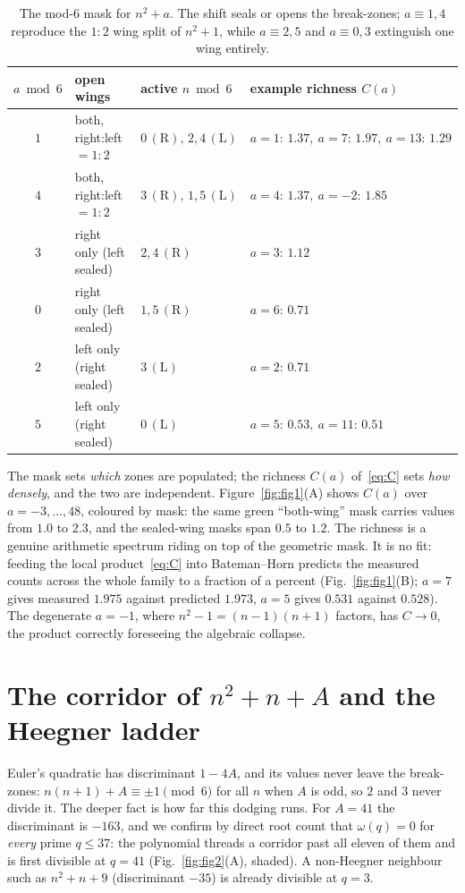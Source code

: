 \documentclass[11pt]{article}
\theoremstyle{definition}
\begin{document}
\begin{table}[t]
\centering\small
\begin{tabular}{clll}
\toprule
$a\bmod6$ & open wings & active $n\bmod6$ & example richness $C(a)$\\
\midrule
$1$ & both, right:left $=1{:}2$ & $0\,(\mathrm{R}),\,2,4\,(\mathrm{L})$ & $a{=}1{:}\,1.37,\ a{=}7{:}\,1.97,\ a{=}13{:}\,1.29$\\
$4$ & both, right:left $=1{:}2$ & $3\,(\mathrm{R}),\,1,5\,(\mathrm{L})$ & $a{=}4{:}\,1.37,\ a{=}{-}2{:}\,1.85$\\
$3$ & right only (left sealed)  & $2,4\,(\mathrm{R})$ & $a{=}3{:}\,1.12$\\
$0$ & right only (left sealed)  & $1,5\,(\mathrm{R})$ & $a{=}6{:}\,0.71$\\
$2$ & left only (right sealed)  & $3\,(\mathrm{L})$ & $a{=}2{:}\,0.71$\\
$5$ & left only (right sealed)  & $0\,(\mathrm{L})$ & $a{=}5{:}\,0.53,\ a{=}11{:}\,0.51$\\
\bottomrule
\end{tabular}
\caption{The mod-$6$ mask for $n^2+a$. The shift seals or opens the break-zones; $a\equiv1,4$ reproduce
the $1{:}2$ wing split of $n^2+1$, while $a\equiv2,5$ and $a\equiv0,3$ extinguish one wing entirely.}
\label{tab:mask}
\end{table}

The mask sets \emph{which} zones are populated; the richness $C(a)$ of~\eqref{eq:C} sets \emph{how
densely}, and the two are independent. Figure~\ref{fig:fig1}(A) shows $C(a)$ over $a=-3,\dots,48$,
coloured by mask: the same green ``both-wing'' mask carries values from $1.0$ to $2.3$, and the
sealed-wing masks span $0.5$ to $1.2$. The richness is a genuine arithmetic spectrum riding on top of
the geometric mask. It is no fit: feeding the local product~\eqref{eq:C} into Bateman--Horn predicts
the measured counts across the whole family to a fraction of a percent (Fig.~\ref{fig:fig1}(B);
$a=7$ gives measured $1.975$ against predicted $1.973$, $a=5$ gives $0.531$ against $0.528$). The
degenerate $a=-1$, where $n^2-1=(n-1)(n+1)$ factors, has $C\to0$, the product correctly foreseeing the
algebraic collapse.

\section{The corridor of $n^2+n+A$ and the Heegner ladder}
Euler's quadratic has discriminant $1-4A$, and its values never leave the break-zones:
$n(n+1)+A\equiv\pm1\pmod6$ for all $n$ when $A$ is odd, so $2$ and $3$ never divide it. The deeper fact
is how far this dodging runs. For $A=41$ the discriminant is $-163$, and we confirm by direct root
count that $\omega(q)=0$ for \emph{every} prime $q\le37$: the polynomial threads a corridor past all
eleven of them and is first divisible at $q=41$ (Fig.~\ref{fig:fig2}(A), shaded). A non-Heegner
neighbour such as $n^2+n+9$ (discriminant $-35$) is already divisible at $q=3$.
\end{document}
